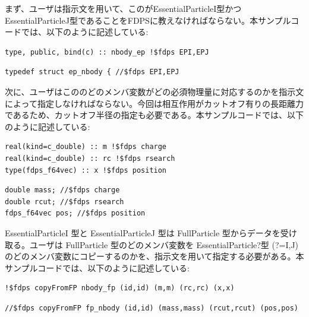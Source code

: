 \ifIF %
まず、ユーザは指示文を用いて、この\structure がEssentialParticleI型かつEssentialParticleJ型であることをFDPSに教えなければならない。本サンプルコードでは、以下のように記述している:
\endifIF
\ifFtn %
\begin{screen}
\begin{verbatim}
type, public, bind(c) :: nbody_ep !$fdps EPI,EPJ
\end{verbatim}
\end{screen}
\endifFtn
\ifC %
\begin{screen}
\begin{verbatim}
typedef struct ep_nbody { //$fdps EPI,EPJ
\end{verbatim}
\end{screen}
\endifC
\ifIF %
次に、ユーザはこの\structure のどのメンバ変数がどの必須物理量に対応するのかを指示文によって指定しなければならない。今回は相互作用がカットオフ有りの長距離力であるため、カットオフ半径の指定も必要である。本サンプルコードでは、以下のように記述している:
\endifIF
\ifFtn %
\begin{screen}
\begin{verbatim}
real(kind=c_double) :: m !$fdps charge
real(kind=c_double) :: rc !$fdps rsearch
type(fdps_f64vec) :: x !$fdps position
\end{verbatim}
\end{screen}
\endifFtn
\ifC %
\begin{screen}
\begin{verbatim}
double mass; //$fdps charge         
double rcut; //$fdps rsearch        
fdps_f64vec pos; //$fdps position   
\end{verbatim}
\end{screen}
\endifC
\ifIF %
EssentialParticleI 型と EssentialParticleJ 型は FullParticle 型からデータを受け取る。ユーザは FullParticle 型のどのメンバ変数を EssentialParticle?型 (?=I,J) のどのメンバ変数にコピーするのかを、指示文を用いて指定する必要がある。本サンプルコードでは、以下のように記述している:
\endifIF
\ifFtn %
\begin{screen}
\begin{verbatim}
!$fdps copyFromFP nbody_fp (id,id) (m,m) (rc,rc) (x,x)
\end{verbatim}
\end{screen}
\endifFtn
\ifC %
\begin{screen}
\begin{verbatim}
//$fdps copyFromFP fp_nbody (id,id) (mass,mass) (rcut,rcut) (pos,pos)
\end{verbatim}
\end{screen}
\endifC

